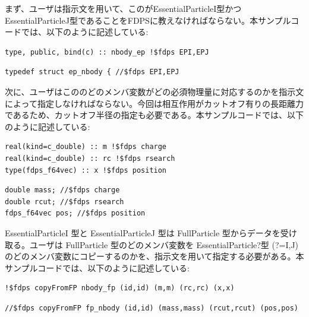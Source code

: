 \ifIF %
まず、ユーザは指示文を用いて、この\structure がEssentialParticleI型かつEssentialParticleJ型であることをFDPSに教えなければならない。本サンプルコードでは、以下のように記述している:
\endifIF
\ifFtn %
\begin{screen}
\begin{verbatim}
type, public, bind(c) :: nbody_ep !$fdps EPI,EPJ
\end{verbatim}
\end{screen}
\endifFtn
\ifC %
\begin{screen}
\begin{verbatim}
typedef struct ep_nbody { //$fdps EPI,EPJ
\end{verbatim}
\end{screen}
\endifC
\ifIF %
次に、ユーザはこの\structure のどのメンバ変数がどの必須物理量に対応するのかを指示文によって指定しなければならない。今回は相互作用がカットオフ有りの長距離力であるため、カットオフ半径の指定も必要である。本サンプルコードでは、以下のように記述している:
\endifIF
\ifFtn %
\begin{screen}
\begin{verbatim}
real(kind=c_double) :: m !$fdps charge
real(kind=c_double) :: rc !$fdps rsearch
type(fdps_f64vec) :: x !$fdps position
\end{verbatim}
\end{screen}
\endifFtn
\ifC %
\begin{screen}
\begin{verbatim}
double mass; //$fdps charge         
double rcut; //$fdps rsearch        
fdps_f64vec pos; //$fdps position   
\end{verbatim}
\end{screen}
\endifC
\ifIF %
EssentialParticleI 型と EssentialParticleJ 型は FullParticle 型からデータを受け取る。ユーザは FullParticle 型のどのメンバ変数を EssentialParticle?型 (?=I,J) のどのメンバ変数にコピーするのかを、指示文を用いて指定する必要がある。本サンプルコードでは、以下のように記述している:
\endifIF
\ifFtn %
\begin{screen}
\begin{verbatim}
!$fdps copyFromFP nbody_fp (id,id) (m,m) (rc,rc) (x,x)
\end{verbatim}
\end{screen}
\endifFtn
\ifC %
\begin{screen}
\begin{verbatim}
//$fdps copyFromFP fp_nbody (id,id) (mass,mass) (rcut,rcut) (pos,pos)
\end{verbatim}
\end{screen}
\endifC

